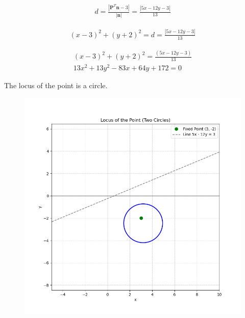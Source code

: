 \documentclass[journal]{IEEEtran}
\begin{document}
\begin{align}
    d = \frac{|\textbf{P}^T \textbf{n} - 3|}{|\textbf{n}|} = \frac{|5x - 12y - 3|}{13}
\end{align}

\begin{align}
   (x-3)^{2}+(y+2)^{2}= d = \frac{|5x - 12y - 3|}{13}
\end{align}

 
\begin{align}
 (x-3)^{2}+(y+2)^{2}= \frac{(5x - 12y - 3)}{13}\\
13x^2 + 13y^2 - 83x + 64y + 172 = 0
\end{align}



The locus of the point is a circle.

\begin{figure}
    \centering
    \includegraphics[width=0.8\linewidth]{figs/circle.png}
    \caption{}
    \label{fig:placeholder}
\end{figure}
\end{document}
